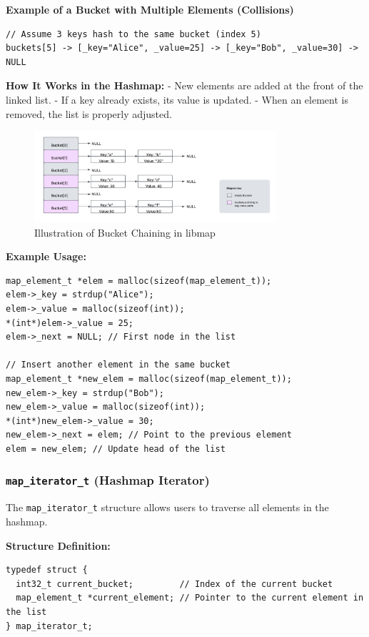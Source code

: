 \documentclass[titlepage]{article}
\begin{document}
\textbf{Example of a Bucket with Multiple Elements (Collisions)}
\begin{verbatim}
// Assume 3 keys hash to the same bucket (index 5)
buckets[5] -> [_key="Alice", _value=25] -> [_key="Bob", _value=30] -> NULL
\end{verbatim}

\textbf{How It Works in the Hashmap:}
- New elements are added at the front of the linked list.
- If a key already exists, its value is updated.
- When an element is removed, the list is properly adjusted.


\begin{figure}[H]
    \centering
    \includegraphics[width=0.8\textwidth]{hashmap_chaining_structure.pdf}
    \caption{Illustration of Bucket Chaining in libmap}
    \label{fig:bucket_chaining}
\end{figure}

\textbf{Example Usage:}
\begin{verbatim}
map_element_t *elem = malloc(sizeof(map_element_t));
elem->_key = strdup("Alice");
elem->_value = malloc(sizeof(int));
*(int*)elem->_value = 25;
elem->_next = NULL; // First node in the list

// Insert another element in the same bucket
map_element_t *new_elem = malloc(sizeof(map_element_t));
new_elem->_key = strdup("Bob");
new_elem->_value = malloc(sizeof(int));
*(int*)new_elem->_value = 30;
new_elem->_next = elem; // Point to the previous element
elem = new_elem; // Update head of the list
\end{verbatim}



\subsubsection{\texttt{map\_iterator\_t} (Hashmap Iterator)}
The \texttt{map\_iterator\_t} structure allows users to traverse all elements in the hashmap.

\textbf{Structure Definition:}
\begin{verbatim}
typedef struct {
  int32_t current_bucket;         // Index of the current bucket
  map_element_t *current_element; // Pointer to the current element in the list
} map_iterator_t;
\end{verbatim}
\end{document}
